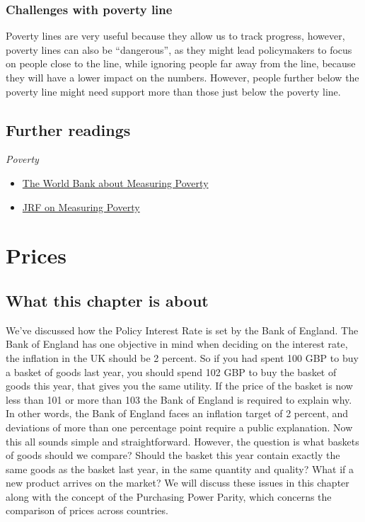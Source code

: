 \documentclass[
]{book}
\begin{document}
\hypertarget{challenges-with-poverty-line}{%
\subsection{Challenges with poverty line}\label{challenges-with-poverty-line}}

Poverty lines are very useful because they allow us to track progress, however, poverty lines can also be ``dangerous'', as they might lead policymakers to focus on people close to the line, while ignoring people far away from the line, because they will have a lower impact on the numbers. However, people further below the poverty line might need support more than those just below the poverty line.

\hypertarget{further-readings-5}{%
\section{Further readings}\label{further-readings-5}}

\emph{Poverty}

\begin{itemize}
\item
  \href{https://www.worldbank.org/en/topic/measuringpoverty}{The World Bank about Measuring Poverty}
\item
  \href{https://www.jrf.org.uk/mpse-2015/measuring-poverty}{JRF on Measuring Poverty}
\end{itemize}

\hypertarget{prices}{%
\chapter{Prices}\label{prices}}

\hypertarget{what-this-chapter-is-about-4}{%
\section{What this chapter is about}\label{what-this-chapter-is-about-4}}

We've discussed how the Policy Interest Rate is set by the Bank of England. The Bank of England has one objective in mind when deciding on the interest rate, the inflation in the UK should be 2 percent. So if you had spent 100 GBP to buy a basket of goods last year, you should spend 102 GBP to buy the basket of goods this year, that gives you the same utility. If the price of the basket is now less than 101 or more than 103 the Bank of England is required to explain why. In other words, the Bank of England faces an inflation target of 2 percent, and deviations of more than one percentage point require a public explanation. Now this all sounds simple and straightforward. However, the question is what baskets of goods should we compare? Should the basket this year contain exactly the same goods as the basket last year, in the same quantity and quality? What if a new product arrives on the market? We will discuss these issues in this chapter along with the concept of the Purchasing Power Parity, which concerns the comparison of prices across countries.
\end{document}
